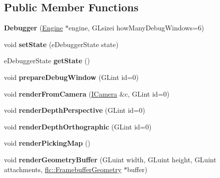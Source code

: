 \subsection*{Public Member Functions}
\begin{DoxyCompactItemize}
\item 
{\bfseries Debugger} (\hyperlink{classflw_1_1Engine}{Engine} $\ast$engine, G\+Lsizei how\+Many\+Debug\+Windows=6)\hypertarget{classflw_1_1flf_1_1Debugger_a4570381482b8e0ae6ec20dcda8b86e56}{}\label{classflw_1_1flf_1_1Debugger_a4570381482b8e0ae6ec20dcda8b86e56}

\item 
void {\bfseries set\+State} (e\+Debugger\+State state)\hypertarget{classflw_1_1flf_1_1Debugger_a2fa89641efc4c14babf974fa5405e88d}{}\label{classflw_1_1flf_1_1Debugger_a2fa89641efc4c14babf974fa5405e88d}

\item 
e\+Debugger\+State {\bfseries get\+State} ()\hypertarget{classflw_1_1flf_1_1Debugger_ae6cf63674c47fb1f08b16b903f9a4c6f}{}\label{classflw_1_1flf_1_1Debugger_ae6cf63674c47fb1f08b16b903f9a4c6f}

\item 
void {\bfseries prepare\+Debug\+Window} (G\+Lint id=0)\hypertarget{classflw_1_1flf_1_1Debugger_a17da1935b9481ac8411d7d213f4aedd1}{}\label{classflw_1_1flf_1_1Debugger_a17da1935b9481ac8411d7d213f4aedd1}

\item 
void {\bfseries render\+From\+Camera} (\hyperlink{classflw_1_1flf_1_1ICamera}{I\+Camera} \&c, G\+Lint id=0)\hypertarget{classflw_1_1flf_1_1Debugger_a2e77e7dabf1de62f9bc77d2a7639482d}{}\label{classflw_1_1flf_1_1Debugger_a2e77e7dabf1de62f9bc77d2a7639482d}

\item 
void {\bfseries render\+Depth\+Perspective} (G\+Lint id=0)\hypertarget{classflw_1_1flf_1_1Debugger_acce2fb29767c433cf66bd1471165230d}{}\label{classflw_1_1flf_1_1Debugger_acce2fb29767c433cf66bd1471165230d}

\item 
void {\bfseries render\+Depth\+Orthographic} (G\+Lint id=0)\hypertarget{classflw_1_1flf_1_1Debugger_ace0a7b5a5a567bb9b10f0c4ed571b62e}{}\label{classflw_1_1flf_1_1Debugger_ace0a7b5a5a567bb9b10f0c4ed571b62e}

\item 
void {\bfseries render\+Picking\+Map} ()\hypertarget{classflw_1_1flf_1_1Debugger_a9e591ee479c22a4fcfaf51a85db03975}{}\label{classflw_1_1flf_1_1Debugger_a9e591ee479c22a4fcfaf51a85db03975}

\item 
void {\bfseries render\+Geometry\+Buffer} (G\+Luint width, G\+Luint height, G\+Luint attachments, \hyperlink{classflw_1_1flc_1_1FramebufferGeometry}{flc\+::\+Framebuffer\+Geometry} $\ast$buffer)\hypertarget{classflw_1_1flf_1_1Debugger_a874b8a109365ef5252835ee536b0bf1f}{}\label{classflw_1_1flf_1_1Debugger_a874b8a109365ef5252835ee536b0bf1f}

\end{DoxyCompactItemize}
